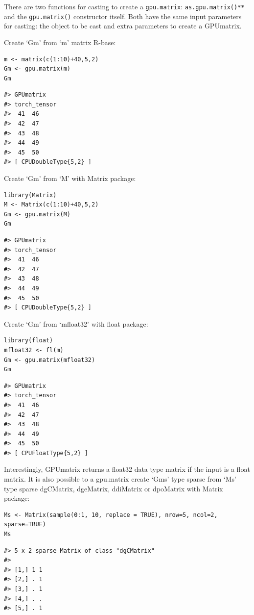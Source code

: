There are two functions for casting to create a \texttt{gpu.matrix}: \texttt{as.gpu.matrix()**} and the \texttt{gpu.matrix()} constructor itself. Both have the same input parameters for casting: the object to be cast and extra parameters to create a GPUmatrix.

Create `Gm' from `m' matrix R-base:

\begin{verbatim}
m <- matrix(c(1:10)+40,5,2)
Gm <- gpu.matrix(m)
Gm
\end{verbatim}

\begin{verbatim}
#> GPUmatrix
#> torch_tensor
#>  41  46
#>  42  47
#>  43  48
#>  44  49
#>  45  50
#> [ CPUDoubleType{5,2} ]
\end{verbatim}

Create `Gm' from `M' with Matrix package:

\begin{verbatim}
library(Matrix)
M <- Matrix(c(1:10)+40,5,2)
Gm <- gpu.matrix(M)
Gm
\end{verbatim}

\begin{verbatim}
#> GPUmatrix
#> torch_tensor
#>  41  46
#>  42  47
#>  43  48
#>  44  49
#>  45  50
#> [ CPUDoubleType{5,2} ]
\end{verbatim}

Create `Gm' from `mfloat32' with float package:

\begin{verbatim}
library(float)
mfloat32 <- fl(m)
Gm <- gpu.matrix(mfloat32)
Gm
\end{verbatim}

\begin{verbatim}
#> GPUmatrix
#> torch_tensor
#>  41  46
#>  42  47
#>  43  48
#>  44  49
#>  45  50
#> [ CPUFloatType{5,2} ]
\end{verbatim}

Interestingly, GPUmatrix returns a float32 data type matrix if the input is a float matrix. It is also possible to a gpu.matrix create `Gms' type sparse from `Ms' type sparse dgCMatrix, dgeMatrix, ddiMatrix or dpoMatrix with Matrix package:

\begin{verbatim}
Ms <- Matrix(sample(0:1, 10, replace = TRUE), nrow=5, ncol=2, sparse=TRUE)
Ms
\end{verbatim}

\begin{verbatim}
#> 5 x 2 sparse Matrix of class "dgCMatrix"
#>         
#> [1,] 1 1
#> [2,] . 1
#> [3,] . 1
#> [4,] . .
#> [5,] . 1
\end{verbatim}

